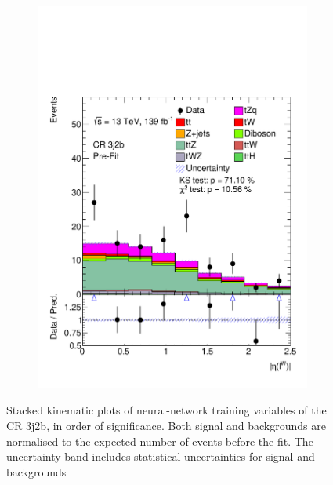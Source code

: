 \begin{figure}[!h]
\begin{subfigure}[b]{0.33\linewidth}
    \includegraphics[width=\linewidth]{ubonn-thesis/Chapters/Chapters_06/Figure/Input_distribution/CR_3j2b_lepW_eta.pdf} 
  \end{subfigure} 
  
  \caption{ Stacked kinematic plots of neural-network training variables of the CR 3j2b, in order of significance. Both signal and backgrounds are normalised to the expected number of events before the fit. The uncertainty band includes statistical uncertainties for signal and backgrounds }
  \label{fig_control1} 
  \end{figure}


